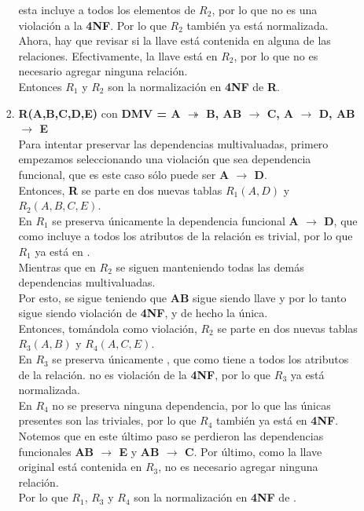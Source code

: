\documentclass{article}
\begin{document}
\begin{enumerate}
\begin{itemize}
\begin{enumerate}
    	    esta incluye a todos los elementos de $R_2$, por lo que no es
    	    una violación a la \textbf{4NF}. Por lo que $R_2$ también ya
    	    está normalizada.\\
    	    Ahora, hay que revisar si la llave está contenida en alguna
    	    de las relaciones. Efectivamente, la llave está en $R_2$, por
    	    lo que no es necesario agregar ninguna relación.\\
    	    Entonces $R_1$ y $R_2$ son la normalización en \textbf{4NF} de
    	    \textbf{R}.
    	    \item \textbf{R(A,B,C,D,E)} con \textbf{DMV = { A $\twoheadrightarrow$ B, AB $\rightarrow$ C, A $\rightarrow$ D, AB $\rightarrow$ E}}\\
    	    Para intentar preservar las dependencias multivaluadas,
    	    primero empezamos seleccionando una violación que sea
    	    dependencia funcional, que es este caso sólo puede ser 
    	    \textbf{A $\rightarrow$ D}.\\
    	    Entonces, \textbf{R} se parte en dos nuevas tablas
    	    $R_1(A, D)$ y $R_2(A, B, C, E)$.\\
    	    En $R_1$ se preserva únicamente la dependencia funcional 
    	    \textbf{A $\rightarrow$ D}, que como incluye a todos los
    	    atributos de la relación es trivial, por lo que $R_1$ ya
    	    está en . \\
    	    Mientras que en $R_2$ se siguen manteniendo todas las demás 
    	    dependencias multivaluadas.\\
    	    Por esto, se sigue teniendo que \textbf{AB} sigue siendo llave
    	    y por lo tanto  sigue siendo
    	    violación de \textbf{4NF}, y de hecho la única.\\
    	    Entonces, tomándola como violación, $R_2$ se parte en dos
    	    nuevas tablas $R_3(A, B)$ y $R_4(A, C, E)$.\\
    	    En $R_3$ se preserva únicamente ,
    	    que como tiene a todos los atributos de la relación. no es 
    	    violación de la \textbf{4NF}, por lo que $R_3$ ya está
    	    normalizada.\\
    	    En $R_4$ no se preserva ninguna dependencia, por lo que las
    	    únicas presentes son las triviales, por lo que $R_4$ también
    	    ya está en \textbf{4NF}.\\
    	    Notemos que en este último paso se perdieron las dependencias
    	    funcionales \textbf{AB $\rightarrow$ E} y \textbf{AB
    	    $\rightarrow$ C}.
    	    Por último, como la llave original está contenida en $R_3$, 
    	    no es necesario agregar ninguna relación.\\
    	    Por lo que $R_1$, $R_3$ y $R_4$ son la normalización en
    	    \textbf{4NF} de .
    	    

\end{enumerate}
\end{itemize}
\end{enumerate}
\end{document}
